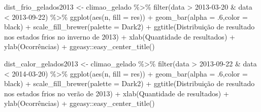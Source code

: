 \documentclass[
]{article}
\newenvironment{Shaded}{\begin{snugshade}}{\end{snugshade}}
\newcommand{\AttributeTok}[1]{\textcolor[rgb]{0.77,0.63,0.00}{#1}}
\newcommand{\DecValTok}[1]{\textcolor[rgb]{0.00,0.00,0.81}{#1}}
\newcommand{\FunctionTok}[1]{\textcolor[rgb]{0.00,0.00,0.00}{#1}}
\newcommand{\NormalTok}[1]{#1}
\newcommand{\OtherTok}[1]{\textcolor[rgb]{0.56,0.35,0.01}{#1}}
\newcommand{\SpecialCharTok}[1]{\textcolor[rgb]{0.00,0.00,0.00}{#1}}
\newcommand{\StringTok}[1]{\textcolor[rgb]{0.31,0.60,0.02}{#1}}
\begin{document}
\begin{Shaded}
\begin{Highlighting}[]
\NormalTok{dist\_frio\_gelados2013 }\OtherTok{\textless{}{-}}\NormalTok{ climao\_gelado }\SpecialCharTok{\%\textgreater{}\%} 
  \FunctionTok{filter}\NormalTok{(data }\SpecialCharTok{\textgreater{}} \StringTok{\textquotesingle{}2013{-}03{-}20\textquotesingle{}} \SpecialCharTok{\&}\NormalTok{ data }\SpecialCharTok{\textless{}} \StringTok{\textquotesingle{}2013{-}09{-}22\textquotesingle{}}\NormalTok{) }\SpecialCharTok{\%\textgreater{}\%}
  \FunctionTok{ggplot}\NormalTok{(}\FunctionTok{aes}\NormalTok{(n, }\AttributeTok{fill =}\NormalTok{ res)) }\SpecialCharTok{+} 
  \FunctionTok{geom\_bar}\NormalTok{(}\AttributeTok{alpha =}\NormalTok{ .}\DecValTok{6}\NormalTok{,}\AttributeTok{color =} \StringTok{\textquotesingle{}black\textquotesingle{}}\NormalTok{) }\SpecialCharTok{+} 
  \FunctionTok{scale\_fill\_brewer}\NormalTok{(}\AttributeTok{palette =} \StringTok{\textquotesingle{}Dark2\textquotesingle{}}\NormalTok{) }\SpecialCharTok{+}
  \FunctionTok{ggtitle}\NormalTok{(}\StringTok{\textquotesingle{}Distribuição de resultado nos estados frios no inverno de 2013\textquotesingle{}}\NormalTok{) }\SpecialCharTok{+}
  \FunctionTok{xlab}\NormalTok{(}\StringTok{\textquotesingle{}Quantidade de resultados\textquotesingle{}}\NormalTok{) }\SpecialCharTok{+} \FunctionTok{ylab}\NormalTok{(}\StringTok{\textquotesingle{}Ocorrências\textquotesingle{}}\NormalTok{) }\SpecialCharTok{+}
\NormalTok{  ggeasy}\SpecialCharTok{::}\FunctionTok{easy\_center\_title}\NormalTok{()}

\NormalTok{dist\_calor\_gelados2013 }\OtherTok{\textless{}{-}}\NormalTok{ climao\_gelado }\SpecialCharTok{\%\textgreater{}\%} 
  \FunctionTok{filter}\NormalTok{(data }\SpecialCharTok{\textgreater{}} \StringTok{\textquotesingle{}2013{-}09{-}22\textquotesingle{}} \SpecialCharTok{\&}\NormalTok{ data }\SpecialCharTok{\textless{}} \StringTok{\textquotesingle{}2014{-}03{-}20\textquotesingle{}}\NormalTok{) }\SpecialCharTok{\%\textgreater{}\%}
  \FunctionTok{ggplot}\NormalTok{(}\FunctionTok{aes}\NormalTok{(n, }\AttributeTok{fill =}\NormalTok{ res)) }\SpecialCharTok{+} 
  \FunctionTok{geom\_bar}\NormalTok{(}\AttributeTok{alpha =}\NormalTok{ .}\DecValTok{6}\NormalTok{,}\AttributeTok{color =} \StringTok{\textquotesingle{}black\textquotesingle{}}\NormalTok{) }\SpecialCharTok{+} 
  \FunctionTok{scale\_fill\_brewer}\NormalTok{(}\AttributeTok{palette =} \StringTok{\textquotesingle{}Dark2\textquotesingle{}}\NormalTok{) }\SpecialCharTok{+}
  \FunctionTok{ggtitle}\NormalTok{(}\StringTok{\textquotesingle{}Distribuição de resultado nos estados frios no verão de 2013\textquotesingle{}}\NormalTok{) }\SpecialCharTok{+}
  \FunctionTok{xlab}\NormalTok{(}\StringTok{\textquotesingle{}Quantidade de resultados\textquotesingle{}}\NormalTok{) }\SpecialCharTok{+} \FunctionTok{ylab}\NormalTok{(}\StringTok{\textquotesingle{}Ocorrências\textquotesingle{}}\NormalTok{) }\SpecialCharTok{+}
\NormalTok{  ggeasy}\SpecialCharTok{::}\FunctionTok{easy\_center\_title}\NormalTok{()}



\end{Highlighting}
\end{Shaded}
\end{document}
